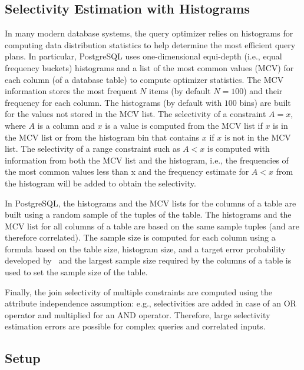 \subsection{Selectivity Estimation with Histograms}\label{sec:vcfreqselhist}
In many modern database systems, the query optimizer relies on
histograms for computing data distribution statistics to help determine the most
efficient query plans. In particular, PostgreSQL 
uses one-dimensional equi-depth (i.e., equal frequency buckets) histograms and a
list of the most common values (MCV) for each column (of a database table) to
compute optimizer statistics. The MCV information stores the most
frequent $N$ items (by default $N=100$) and their frequency for each column. The
histograms (by default with $100$ bins) are built for the values not stored in
the MCV list. The selectivity of a constraint $A=x$, where $A$ is a
column and $x$ is a value is computed from the MCV list if $x$ is in the MCV
list or from the histogram bin that contains $x$ if $x$ is not in the MCV list.
The selectivity of a range constraint such as $A<x$ is computed with information from both the MCV
list and the histogram, i.e., the
frequencies of the most common values less than x and the frequency estimate for
$A<x$ from the histogram will be added to obtain the selectivity.

In PostgreSQL, the histograms and the MCV lists for the
columns of a table are built using a random sample of the tuples of the table. The
histograms and the MCV list for all columns of a table are based on the same
sample tuples (and are therefore correlated).  The sample size is computed for
each column using a formula based on the table size, histogram size, and a
target error probability developed by~\citet{ChaudhuriMN98}  and the largest sample size required by
the columns of a table is used to set the sample size of the table. 

Finally, the join selectivity of multiple constraints are computed using
the attribute independence assumption: e.g., selectivities are added in case of an
OR operator and multiplied for an AND operator.  Therefore, large selectivity
estimation errors are possible for complex queries and correlated inputs. 

\subsection{Setup}

